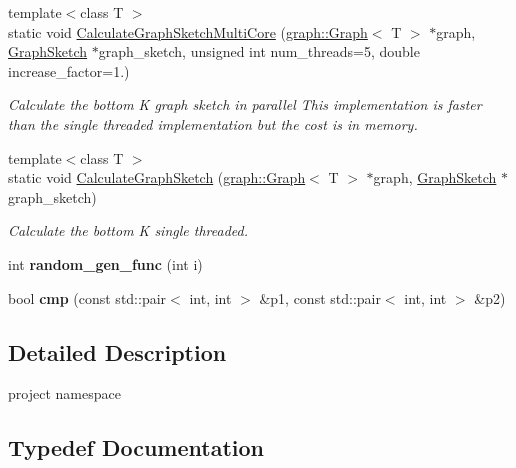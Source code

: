 \begin{DoxyCompactItemize}
\item 
{\footnotesize template$<$class T $>$ }\\static void \hyperlink{namespaceall__distance__sketch_a7fea917111c3851d7c909e896fbad571}{Calculate\+Graph\+Sketch\+Multi\+Core} (\hyperlink{classall__distance__sketch_1_1graph_1_1Graph}{graph\+::\+Graph}$<$ T $>$ $\ast$graph, \hyperlink{classall__distance__sketch_1_1GraphSketch}{Graph\+Sketch} $\ast$graph\+\_\+sketch, unsigned int num\+\_\+threads=5, double increase\+\_\+factor=1.)
\begin{DoxyCompactList}\small\item\em Calculate the bottom K graph sketch in parallel This implementation is faster than the single threaded implementation but the cost is in memory. \end{DoxyCompactList}\item 
{\footnotesize template$<$class T $>$ }\\static void \hyperlink{namespaceall__distance__sketch_a1e07f2d9df73bee36e926822ce0bb2ea}{Calculate\+Graph\+Sketch} (\hyperlink{classall__distance__sketch_1_1graph_1_1Graph}{graph\+::\+Graph}$<$ T $>$ $\ast$graph, \hyperlink{classall__distance__sketch_1_1GraphSketch}{Graph\+Sketch} $\ast$graph\+\_\+sketch)
\begin{DoxyCompactList}\small\item\em Calculate the bottom K single threaded. \end{DoxyCompactList}\item 
\hypertarget{namespaceall__distance__sketch_ac3afb94bba0e0305875629946729d1f7}{}int {\bfseries random\+\_\+gen\+\_\+func} (int i)\label{namespaceall__distance__sketch_ac3afb94bba0e0305875629946729d1f7}

\item 
\hypertarget{namespaceall__distance__sketch_a608d793c40489324eab25253cf430561}{}bool {\bfseries cmp} (const std\+::pair$<$ int, int $>$ \&p1, const std\+::pair$<$ int, int $>$ \&p2)\label{namespaceall__distance__sketch_a608d793c40489324eab25253cf430561}

\end{DoxyCompactItemize}


\subsection{Detailed Description}
project namespace 

\subsection{Typedef Documentation}
\hypertarget{namespaceall__distance__sketch_aeb3aa8f88e2ff80d4625d227ad385dae}{}
